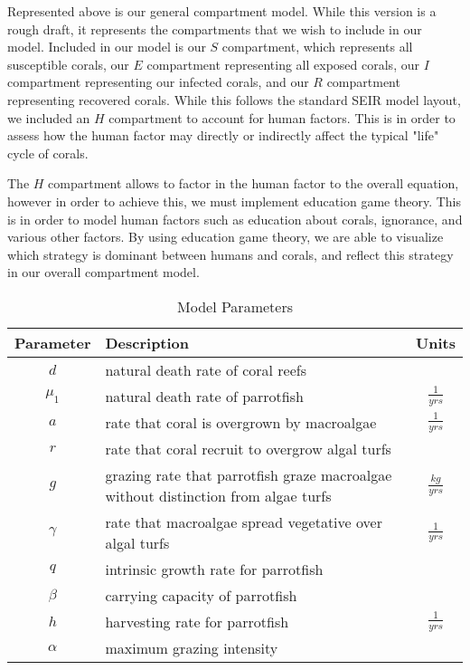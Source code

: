 \documentclass[12pt]{article}
\begin{document}
Represented above is our general compartment model. While this version is a rough draft, it represents the compartments that we wish to include in our model. Included in our model is our $S$ compartment, which represents all susceptible corals, our $E$ compartment representing all exposed corals, our $I$ compartment representing our infected corals, and our $R$ compartment representing recovered corals. While this follows the standard SEIR model layout, we included an $H$ compartment to account for human factors. This is in order to assess how the human factor may directly or indirectly affect the typical "life" cycle of corals. \par
The $H$ compartment allows to factor in the human factor to the overall equation, however in order to achieve this, we must implement education game theory. This is in order to model human factors such as education about corals, ignorance, and various other factors. By using education game theory, we are able to visualize which strategy is dominant between humans and corals, and reflect this strategy in our overall compartment model.

\begin{table}[H]
    \centering
    \begin{tabular}{c p{9cm} c}
        \hline
        Parameter & Description & Units  \\
        \hline
        \hline
        $d$ & natural death rate of coral reefs & \\
        $\mu_{1}$ & natural death rate of parrotfish & $\frac{1}{yrs}$\cite{12_noaa_report}\\
        $a$ & rate that coral is overgrown by macroalgae & $\frac{1}{yrs}$\\
        $r$ & rate that coral recruit to overgrow algal turfs & \\
        $g$ & grazing rate that parrotfish graze macroalgae without distinction from algae turfs & $\frac{kg}{yrs}$\\
        $\gamma$ & rate that macroalgae spread vegetative over algal turfs & $\frac{1}{yrs}$\\
        $q$ & intrinsic growth rate for parrotfish & \\
        $\beta$ & carrying capacity of parrotfish & \\
        $h$ & harvesting rate for parrotfish & $\frac{1}{yrs}$\cite{12_noaa_report}\\
        $\alpha$ & maximum grazing intensity & \\
        \hline
    \end{tabular}
    \caption{Model Parameters}
    \label{tab:my_label}
\end{table}
\end{document}
